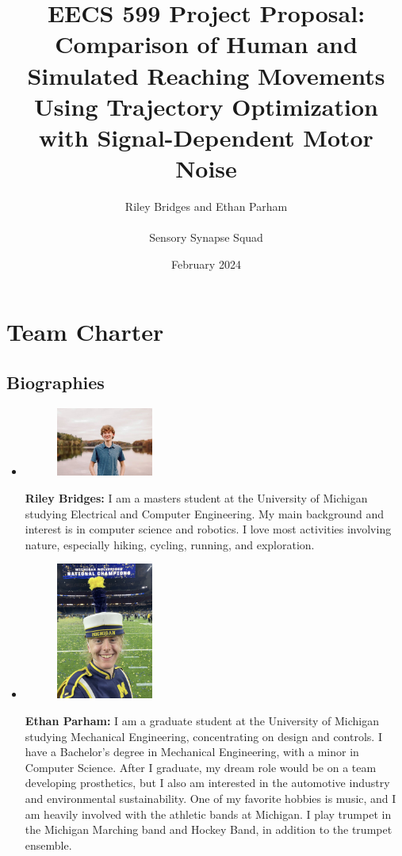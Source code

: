 \documentclass[table,12pt]{article}
\title{\textbf{EECS 599 Project Proposal:} \\
    Comparison of Human and Simulated Reaching Movements Using Trajectory Optimization with Signal-Dependent Motor Noise}
\author{Riley Bridges and Ethan Parham \\\\
    Sensory Synapse Squad}
\date{February 2024}
\begin{document}
\maketitle
\newpage

\section{Team Charter}
\subsection{Biographies}
\begin{itemize}
    \item \begin{figure}[H]
        \centering
        \includegraphics[width=0.3\textwidth]{riley_picture.jpg}
    \end{figure}
    \textbf{Riley Bridges:} I am a masters student at the University of Michigan studying Electrical and Computer Engineering. My main background and interest is in computer science and robotics. I love most activities involving nature, especially hiking, cycling, running, and exploration.

    \item \begin{figure}[H]
        \centering
        \includegraphics[width=0.3\textwidth]{ethan_picture.png}
    \end{figure}
    \textbf{Ethan Parham:} I am a graduate student at the University of Michigan studying Mechanical Engineering, concentrating on design and controls. I have a Bachelor's degree in Mechanical Engineering, with a minor in Computer Science. After I graduate, my dream role would be on a team developing prosthetics, but I also am interested in the automotive industry and environmental sustainability. One of my favorite hobbies is music, and I am heavily involved with the athletic bands at Michigan. I play trumpet in the Michigan Marching band and Hockey Band, in addition to the trumpet ensemble. 
\end{itemize}
\end{document}
